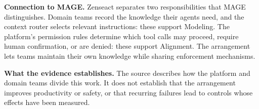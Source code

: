 \textbf{Connection to MAGE.} Zenseact separates two responsibilities that MAGE distinguishes. Domain teams record the knowledge their agents need, and the context router selects relevant instructions: these support Modeling. The platform's permission rules determine which tool calls may proceed, require human confirmation, or are denied: these support Alignment. The arrangement lets teams maintain their own knowledge while sharing enforcement mechanisms.

\textbf{What the evidence establishes.} The source describes how the platform and domain teams divide this work. It does not establish that the arrangement improves productivity or safety, or that recurring failures lead to controls whose effects have been measured.
